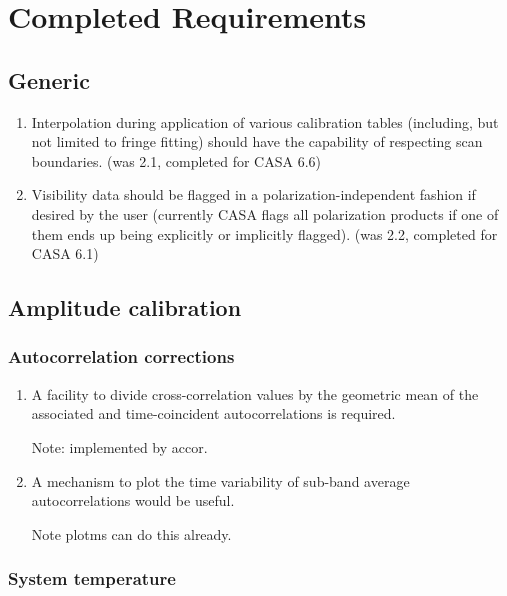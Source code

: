 \documentclass[11pt,a4paper]{article}
\begin{document}
\appendix

\section{Completed Requirements}

\subsection{Generic}

\begin{enumerate}[subseclist]

\item Interpolation during application of various calibration tables
  (including, but not limited to fringe fitting) should have the
  capability of respecting scan boundaries.  (was 2.1, completed for CASA 6.6)

\item Visibility data should be flagged in a polarization-independent
  fashion if desired by the user (currently CASA flags all
  polarization products if one of them ends up being explicitly or
  implicitly flagged).  (was 2.2, completed for CASA 6.1)

\end{enumerate}


\subsection{Amplitude calibration}

\subsubsection{Autocorrelation corrections}

\begin{enumerate}[subsubseclist]

\item A facility to divide cross-correlation values by the geometric
  mean of the associated and time-coincident autocorrelations is
  required.

  Note: implemented by accor.

\item A mechanism to plot the time variability of sub-band average
  autocorrelations would be useful.

  Note plotms can do this already.
  
\end{enumerate}

\subsubsection{System temperature}
\end{document}
